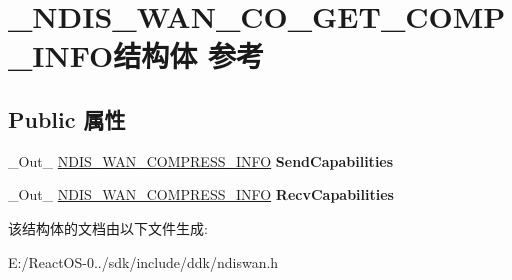 \hypertarget{struct___n_d_i_s___w_a_n___c_o___g_e_t___c_o_m_p___i_n_f_o}{}\section{\+\_\+\+N\+D\+I\+S\+\_\+\+W\+A\+N\+\_\+\+C\+O\+\_\+\+G\+E\+T\+\_\+\+C\+O\+M\+P\+\_\+\+I\+N\+F\+O结构体 参考}
\label{struct___n_d_i_s___w_a_n___c_o___g_e_t___c_o_m_p___i_n_f_o}
\subsection*{Public 属性}
\begin{DoxyCompactItemize}
\item 
\mbox{\label{struct___n_d_i_s___w_a_n___c_o___g_e_t___c_o_m_p___i_n_f_o_a70f50fa46ba0b0929c12b10a3c4e5191}} 
\+\_\+\+Out\+\_\+ \hyperlink{struct___n_d_i_s___w_a_n___c_o_m_p_r_e_s_s___i_n_f_o}{N\+D\+I\+S\+\_\+\+W\+A\+N\+\_\+\+C\+O\+M\+P\+R\+E\+S\+S\+\_\+\+I\+N\+FO} {\bfseries Send\+Capabilities}
\item 
\mbox{\label{struct___n_d_i_s___w_a_n___c_o___g_e_t___c_o_m_p___i_n_f_o_a957b2c40e5002a74e0971f68a577a631}} 
\+\_\+\+Out\+\_\+ \hyperlink{struct___n_d_i_s___w_a_n___c_o_m_p_r_e_s_s___i_n_f_o}{N\+D\+I\+S\+\_\+\+W\+A\+N\+\_\+\+C\+O\+M\+P\+R\+E\+S\+S\+\_\+\+I\+N\+FO} {\bfseries Recv\+Capabilities}
\end{DoxyCompactItemize}


该结构体的文档由以下文件生成\+:\begin{DoxyCompactItemize}
\item 
E\+:/\+React\+O\+S-\/0../sdk/include/ddk/ndiswan.\+h\end{DoxyCompactItemize}
